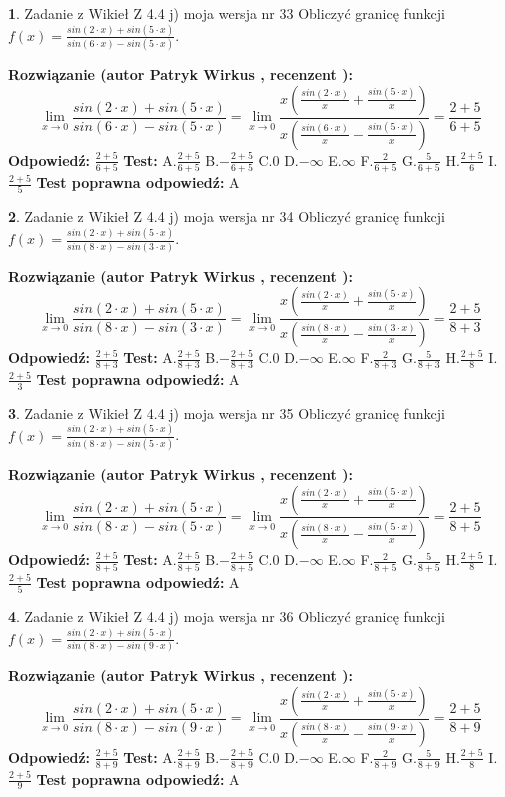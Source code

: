 \documentclass[12pt, a4paper]{article}
\theoremstyle{definition} %
\newtheorem{zad}{}
\newcommand{\zadStart}[1]{\begin{zad}#1\newline}
\newcommand{\zadStop}{\end{zad}}
\newcommand{\rozwStart}[2]{\noindent \textbf{Rozwiązanie (autor #1 , recenzent #2): }\newline}
\newcommand{\rozwStop}{\newline}
\newcommand{\odpStart}{\noindent \textbf{Odpowiedź:}\newline}
\newcommand{\odpStop}{\newline}
\newcommand{\testStart}{\noindent \textbf{Test:}\newline}
\newcommand{\testStop}{\newline}
\newcommand{\kluczStart}{\noindent \textbf{Test poprawna odpowiedź:}\newline}
\newcommand{\kluczStop}{\newline}
\begin{document}
\zadStart{Zadanie z Wikieł Z 4.4 j) moja wersja nr 33}
Obliczyć granicę funkcji $f(x)=\frac{sin(2\cdot x) +sin(5\cdot x)}{sin(6\cdot x) -sin(5\cdot x)}$.
\zadStop
\rozwStart{Patryk Wirkus}{}
$$\lim\limits_{x\to 0}\frac{sin(2\cdot x) +sin(5\cdot x)}{sin(6\cdot x) -sin(5\cdot x)}=\lim\limits_{x\to 0}\frac{x(\frac{sin(2\cdot x)}{x}+\frac{sin(5\cdot x)}{x})}{x(\frac{sin(6\cdot x)}{x}-\frac{sin(5\cdot x)}{x})}=\frac{2+5}{6+5}$$
\rozwStop
\odpStart
$\frac{2+5}{6+5}$
\odpStop
\testStart
A.$\frac{2+5}{6+5}$
B.$-\frac{2+5}{6+5}$
C.$0$
D.$-\infty$
E.$\infty$
F.$\frac{2}{6+5}$
G.$\frac{5}{6+5}$
H.$\frac{2+5}{6}$
I.$\frac{2+5}{5}$
\testStop
\kluczStart
A
\kluczStop



\zadStart{Zadanie z Wikieł Z 4.4 j) moja wersja nr 34}
Obliczyć granicę funkcji $f(x)=\frac{sin(2\cdot x) +sin(5\cdot x)}{sin(8\cdot x) -sin(3\cdot x)}$.
\zadStop
\rozwStart{Patryk Wirkus}{}
$$\lim\limits_{x\to 0}\frac{sin(2\cdot x) +sin(5\cdot x)}{sin(8\cdot x) -sin(3\cdot x)}=\lim\limits_{x\to 0}\frac{x(\frac{sin(2\cdot x)}{x}+\frac{sin(5\cdot x)}{x})}{x(\frac{sin(8\cdot x)}{x}-\frac{sin(3\cdot x)}{x})}=\frac{2+5}{8+3}$$
\rozwStop
\odpStart
$\frac{2+5}{8+3}$
\odpStop
\testStart
A.$\frac{2+5}{8+3}$
B.$-\frac{2+5}{8+3}$
C.$0$
D.$-\infty$
E.$\infty$
F.$\frac{2}{8+3}$
G.$\frac{5}{8+3}$
H.$\frac{2+5}{8}$
I.$\frac{2+5}{3}$
\testStop
\kluczStart
A
\kluczStop



\zadStart{Zadanie z Wikieł Z 4.4 j) moja wersja nr 35}
Obliczyć granicę funkcji $f(x)=\frac{sin(2\cdot x) +sin(5\cdot x)}{sin(8\cdot x) -sin(5\cdot x)}$.
\zadStop
\rozwStart{Patryk Wirkus}{}
$$\lim\limits_{x\to 0}\frac{sin(2\cdot x) +sin(5\cdot x)}{sin(8\cdot x) -sin(5\cdot x)}=\lim\limits_{x\to 0}\frac{x(\frac{sin(2\cdot x)}{x}+\frac{sin(5\cdot x)}{x})}{x(\frac{sin(8\cdot x)}{x}-\frac{sin(5\cdot x)}{x})}=\frac{2+5}{8+5}$$
\rozwStop
\odpStart
$\frac{2+5}{8+5}$
\odpStop
\testStart
A.$\frac{2+5}{8+5}$
B.$-\frac{2+5}{8+5}$
C.$0$
D.$-\infty$
E.$\infty$
F.$\frac{2}{8+5}$
G.$\frac{5}{8+5}$
H.$\frac{2+5}{8}$
I.$\frac{2+5}{5}$
\testStop
\kluczStart
A
\kluczStop



\zadStart{Zadanie z Wikieł Z 4.4 j) moja wersja nr 36}
Obliczyć granicę funkcji $f(x)=\frac{sin(2\cdot x) +sin(5\cdot x)}{sin(8\cdot x) -sin(9\cdot x)}$.
\zadStop
\rozwStart{Patryk Wirkus}{}
$$\lim\limits_{x\to 0}\frac{sin(2\cdot x) +sin(5\cdot x)}{sin(8\cdot x) -sin(9\cdot x)}=\lim\limits_{x\to 0}\frac{x(\frac{sin(2\cdot x)}{x}+\frac{sin(5\cdot x)}{x})}{x(\frac{sin(8\cdot x)}{x}-\frac{sin(9\cdot x)}{x})}=\frac{2+5}{8+9}$$
\rozwStop
\odpStart
$\frac{2+5}{8+9}$
\odpStop
\testStart
A.$\frac{2+5}{8+9}$
B.$-\frac{2+5}{8+9}$
C.$0$
D.$-\infty$
E.$\infty$
F.$\frac{2}{8+9}$
G.$\frac{5}{8+9}$
H.$\frac{2+5}{8}$
I.$\frac{2+5}{9}$
\testStop
\kluczStart
A
\kluczStop
\end{document}
